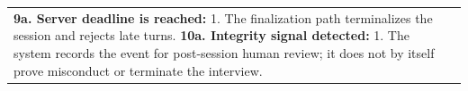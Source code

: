 \begin{longtable}{|>{\raggedright\arraybackslash}p{}|>{\raggedright\arraybackslash}p{}|}
\textbf{9a. Server deadline is reached:} \newline
\hspace*{1em}1. The finalization path terminalizes the session and rejects late turns. \newline
\textbf{10a. Integrity signal detected:} \newline
\hspace*{1em}1. The system records the event for post-session human review; it does not by itself prove misconduct or terminate the interview. \\
\end{longtable}

\renewcommand{\arraystretch}{1.12}
